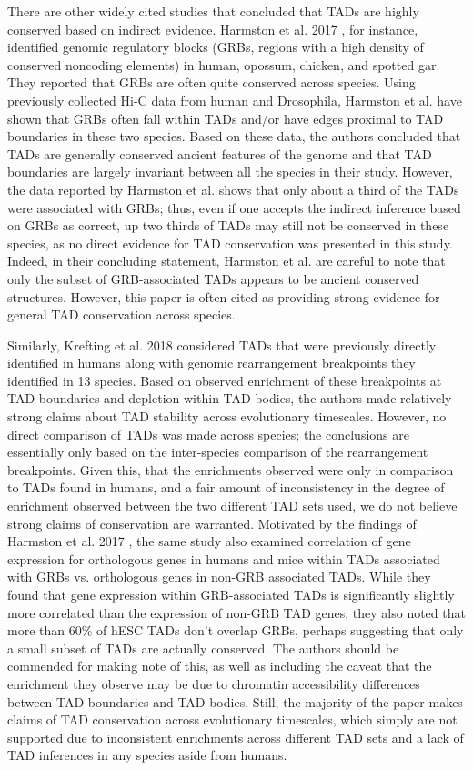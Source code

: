 There are other widely cited studies that concluded that TADs are highly conserved based on indirect evidence. Harmston et al. 2017 \cite{Harmston.2017}, for instance, identified genomic regulatory blocks (GRBs, regions with a high density of conserved noncoding elements) in human, opossum, chicken, and spotted gar. They reported that GRBs are often quite conserved across species. Using previously collected Hi-C data from human and Drosophila, Harmston et al. have shown that GRBs often fall within TADs and/or have edges proximal to TAD boundaries in these two species. Based on these data, the authors concluded that TADs are generally conserved ancient features of the genome and that TAD boundaries are largely invariant between all  the species in their study. However, the data reported by Harmston et al. shows that only about a third of the TADs were associated with GRBs; thus, even if one accepts the indirect inference based on GRBs as correct, up two thirds of TADs may still not be conserved in these species, as no direct evidence for TAD conservation was presented in this study. Indeed, in their concluding statement, Harmston et al. are careful to note that only the subset of GRB-associated TADs appears to be ancient conserved structures. However, this paper is often cited as providing strong evidence for general TAD conservation across species.  

Similarly, Krefting et al. 2018 \cite{Krefting.2018} considered TADs that were previously directly identified in humans \cite{Dixon.2012, Rao.2014} along with genomic rearrangement breakpoints they identified in 13 species. Based on observed enrichment of these breakpoints at TAD boundaries and depletion within TAD bodies, the authors made relatively strong claims about TAD stability across evolutionary timescales. However, no direct comparison of TADs was made across species; the conclusions are essentially only based on the inter-species comparison of the rearrangement breakpoints. Given this, that the enrichments observed were only in comparison to TADs found in humans, and a fair amount of inconsistency in the degree of enrichment observed between the two different TAD sets used, we do not believe strong claims of conservation are warranted. Motivated by the findings of Harmston et al. 2017 \cite{Harmston.2017}, the same study also examined correlation of gene expression for orthologous genes in humans and mice within TADs associated with GRBs vs. orthologous genes in non-GRB associated TADs. While they found that gene expression within GRB-associated TADs is significantly slightly more correlated than the expression of non-GRB TAD genes, they also noted that more than 60\% of hESC TADs don't overlap GRBs, perhaps suggesting that only a small subset of TADs are actually conserved. The authors should be commended for making note of this, as well as including the caveat that the enrichment they observe may be due to chromatin accessibility differences between TAD boundaries and TAD bodies. Still, the majority of the paper makes claims of TAD conservation across evolutionary timescales, which simply are not supported due to inconsistent enrichments across different TAD sets and a lack of TAD inferences in any species aside from humans.

